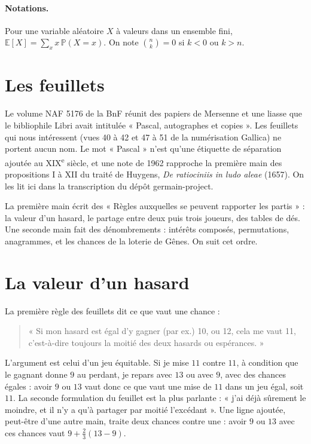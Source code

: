 \documentclass[11pt,a4paper]{article}
\theoremstyle{plain}
\theoremstyle{definition}
\theoremstyle{remark}
\newcommand{\Prob}{\mathbb{P}}
\newcommand{\E}{\mathbb{E}}
\begin{document}
\paragraph{Notations.} Pour une variable aléatoire $X$ à valeurs dans un ensemble fini, $\E[X]=\sum_xx\,\Prob(X=x)$. On note $\binom nk=0$ si $k<0$ ou $k>n$.

\tableofcontents

\section{Les feuillets}

Le volume NAF 5176 de la BnF réunit des papiers de Mersenne et une liasse que le bibliophile Libri avait intitulée « Pascal, autographes et copies ». Les feuillets qui nous intéressent (vues 40 à 42 et 47 à 51 de la numérisation Gallica) ne portent aucun nom. Le mot « Pascal » n'est qu'une étiquette de séparation ajoutée au XIX\textsuperscript{e} siècle, et une note de 1962 rapproche la première main des propositions I à XII du traité de Huygens, \emph{De ratiociniis in ludo aleae} (1657). On les lit ici dans la transcription du dépôt germain-project.

La première main écrit des « Règles auxquelles se peuvent rapporter les partis » : la valeur d'un hasard, le partage entre deux puis trois joueurs, des tables de dés. Une seconde main fait des dénombrements : intérêts composés, permutations, anagrammes, et les chances de la loterie de Gênes. On suit cet ordre.

\section{La valeur d'un hasard}

La première règle des feuillets dit ce que vaut une chance :

\begin{quote}
« Si mon hasard est égal d'y gagner (par ex.) 10, ou 12, cela me vaut 11, c'est-à-dire toujours la moitié des deux hasards ou espérances. »
\end{quote}

L'argument est celui d'un jeu équitable. Si je mise $11$ contre $11$, à condition que le gagnant donne $9$ au perdant, je repars avec $13$ ou avec $9$, avec des chances égales : avoir $9$ ou $13$ vaut donc ce que vaut une mise de $11$ dans un jeu égal, soit $11$. La seconde formulation du feuillet est la plus parlante : « j'ai déjà sûrement le moindre, et il n'y a qu'à partager par moitié l'excédant ». Une ligne ajoutée, peut-être d'une autre main, traite deux chances contre une : avoir $9$ ou $13$ avec ces chances vaut $9+\frac23(13-9)$.
\end{document}
